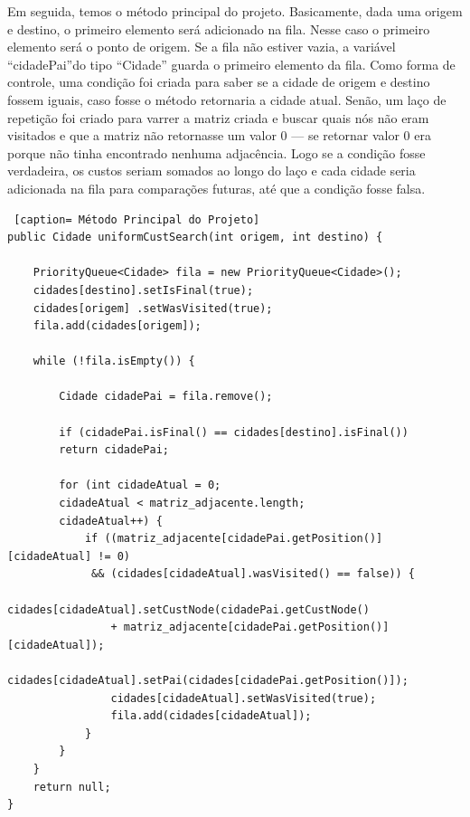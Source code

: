 \documentclass[12pt]{article}
\begin{document}
Em seguida, temos o método principal do projeto. Basicamente, dada uma origem e destino, o primeiro elemento será adicionado na fila. Nesse caso o primeiro elemento será o ponto de origem. Se a fila não estiver vazia, a variável ``cidadePai''do tipo ``Cidade'' guarda o primeiro elemento da fila. Como forma de controle, uma condição foi criada para saber se a cidade de origem e destino fossem iguais, caso fosse o método retornaria a cidade atual. Senão, um laço de repetição foi criado para varrer a matriz criada e buscar quais nós não eram visitados e que a matriz não retornasse um valor 0 --- se retornar valor 0 era porque não tinha encontrado nenhuma adjacência. Logo se a condição fosse verdadeira, os custos seriam somados ao longo do laço e cada cidade seria adicionada na fila para comparações futuras, até que a condição fosse falsa. 
\begin{lstlisting} [caption= Método Principal do Projeto]
public Cidade uniformCustSearch(int origem, int destino) {

	PriorityQueue<Cidade> fila = new PriorityQueue<Cidade>();
	cidades[destino].setIsFinal(true);
	cidades[origem] .setWasVisited(true);
	fila.add(cidades[origem]);
	
	while (!fila.isEmpty()) {
	
		Cidade cidadePai = fila.remove();
		
		if (cidadePai.isFinal() == cidades[destino].isFinal())
		return cidadePai;
		
		for (int cidadeAtual = 0; 
		cidadeAtual < matriz_adjacente.length; 
		cidadeAtual++) {
			if ((matriz_adjacente[cidadePai.getPosition()][cidadeAtual] != 0)
			 && (cidades[cidadeAtual].wasVisited() == false)) {
				cidades[cidadeAtual].setCustNode(cidadePai.getCustNode() 
				+ matriz_adjacente[cidadePai.getPosition()][cidadeAtual]);
				cidades[cidadeAtual].setPai(cidades[cidadePai.getPosition()]);
				cidades[cidadeAtual].setWasVisited(true);
				fila.add(cidades[cidadeAtual]);
			}
		}
	}
	return null;
}
\end{lstlisting}
\end{document}
